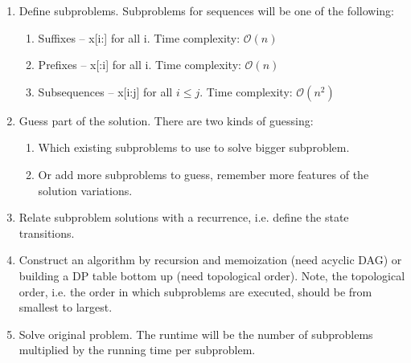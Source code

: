 \documentclass{article}
\newcommand{\bigO}{\mathcal{O}}
\begin{document}
    \begin{enumerate}
        \item Define subproblems. Subproblems for sequences will be one of the following:
        \begin{enumerate}
            \item Suffixes -- x[i:] for all i. Time complexity: $\bigO(n)$
            \item Prefixes -- x[:i] for all i. Time complexity: $\bigO(n)$
            \item Subsequences -- x[i:j] for all $i \leq j$. Time complexity: $\bigO(n^2)$
        \end{enumerate}
        
        \item Guess part of the solution. There are two kinds of guessing:
        \begin{enumerate}
            \item Which existing subproblems to use to solve bigger subproblem.
            \item Or add more subproblems to guess, remember more features of the solution variations.
        \end{enumerate}
        
        \item Relate subproblem solutions with a recurrence, i.e. define the state transitions.
        
        \item Construct an algorithm by recursion and memoization (need acyclic DAG) or building a DP table bottom up (need topological order). Note, the topological order, i.e. the order in which subproblems are executed, should be from smallest to largest.
        
        \item Solve original problem. The runtime will be the number of subproblems multiplied by the running time per subproblem.
    \end{enumerate}
    
\end{document}
